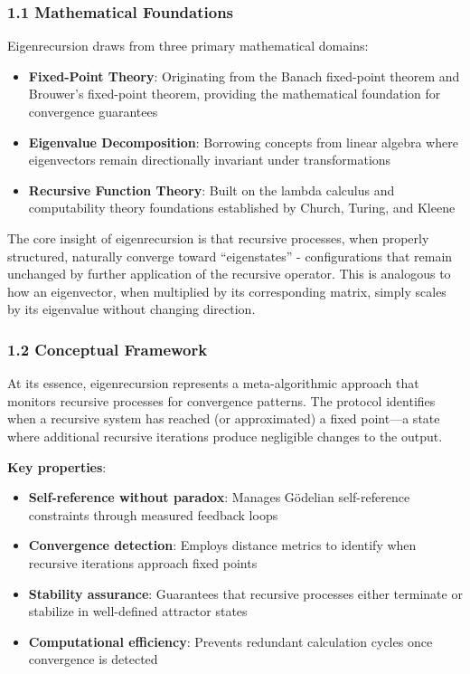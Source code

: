 \documentclass[
]{article}
\providecommand{\tightlist}{%
  \setlength{\itemsep}{0pt}\setlength{\parskip}{0pt}}
\begin{document}
\subsubsection{1.1 Mathematical
Foundations}\label{mathematical-foundations}

Eigenrecursion draws from three primary mathematical domains:

\begin{itemize}
\tightlist
\item
  \textbf{Fixed-Point Theory}: Originating from the Banach fixed-point
  theorem and Brouwer's fixed-point theorem, providing the mathematical
  foundation for convergence guarantees
\item
  \textbf{Eigenvalue Decomposition}: Borrowing concepts from linear
  algebra where eigenvectors remain directionally invariant under
  transformations
\item
  \textbf{Recursive Function Theory}: Built on the lambda calculus and
  computability theory foundations established by Church, Turing, and
  Kleene
\end{itemize}

The core insight of eigenrecursion is that recursive processes, when
properly structured, naturally converge toward ``eigenstates'' -
configurations that remain unchanged by further application of the
recursive operator. This is analogous to how an eigenvector, when
multiplied by its corresponding matrix, simply scales by its eigenvalue
without changing direction.

\subsubsection{1.2 Conceptual Framework}\label{conceptual-framework}

At its essence, eigenrecursion represents a meta-algorithmic approach
that monitors recursive processes for convergence patterns. The protocol
identifies when a recursive system has reached (or approximated) a fixed
point---a state where additional recursive iterations produce negligible
changes to the output.

\textbf{Key properties}:

\begin{itemize}
\tightlist
\item
  \textbf{Self-reference without paradox}: Manages Gödelian
  self-reference constraints through measured feedback loops
\item
  \textbf{Convergence detection}: Employs distance metrics to identify
  when recursive iterations approach fixed points
\item
  \textbf{Stability assurance}: Guarantees that recursive processes
  either terminate or stabilize in well-defined attractor states
\item
  \textbf{Computational efficiency}: Prevents redundant calculation
  cycles once convergence is detected
\end{itemize}
\end{document}
